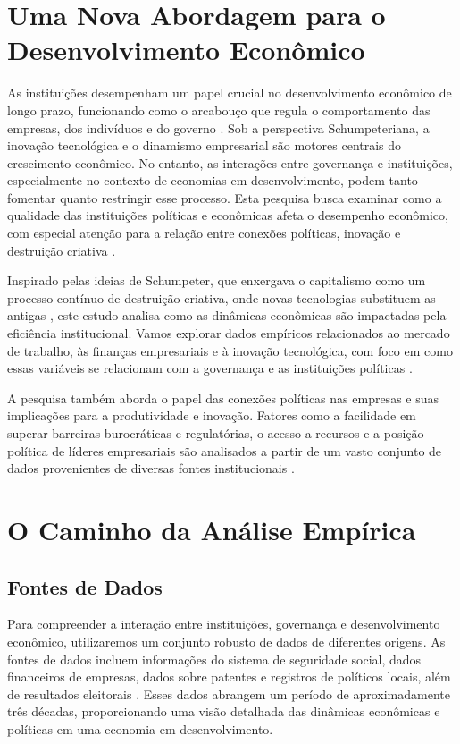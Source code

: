 \section*{Uma Nova Abordagem para o Desenvolvimento Econômico}

As instituições desempenham um papel crucial no desenvolvimento econômico de longo prazo, funcionando como o arcabouço que regula o comportamento das empresas, dos indivíduos e do governo \cite{}. Sob a perspectiva Schumpeteriana, a inovação tecnológica e o dinamismo empresarial são motores centrais do crescimento econômico. No entanto, as interações entre governança e instituições, especialmente no contexto de economias em desenvolvimento, podem tanto fomentar quanto restringir esse processo. Esta pesquisa busca examinar como a qualidade das instituições políticas e econômicas afeta o desempenho econômico, com especial atenção para a relação entre conexões políticas, inovação e destruição criativa \cite{artigo1-SchumpeterianGrowthModel}.

Inspirado pelas ideias de Schumpeter, que enxergava o capitalismo como um processo contínuo de destruição criativa, onde novas tecnologias substituem as antigas \cite{Freitas2007UmaDD}, este estudo analisa como as dinâmicas econômicas são impactadas pela eficiência institucional. Vamos explorar dados empíricos relacionados ao mercado de trabalho, às finanças empresariais e à inovação tecnológica, com foco em como essas variáveis se relacionam com a governança e as instituições políticas \cite{Felipe2008InstituiesEM}.

A pesquisa também aborda o papel das conexões políticas nas empresas e suas implicações para a produtividade e inovação. Fatores como a facilidade em superar barreiras burocráticas e regulatórias, o acesso a recursos e a posição política de líderes empresariais são analisados a partir de um vasto conjunto de dados provenientes de diversas fontes institucionais \cite{Filho_Filho_2022}.

\section*{O Caminho da Análise Empírica}

\subsection*{Fontes de Dados}

Para compreender a interação entre instituições, governança e desenvolvimento econômico, utilizaremos um conjunto robusto de dados de diferentes origens. As fontes de dados incluem informações do sistema de seguridade social, dados financeiros de empresas, dados sobre patentes e registros de políticos locais, além de resultados eleitorais \cite{Pond2005InstituiesEM}. Esses dados abrangem um período de aproximadamente três décadas, proporcionando uma visão detalhada das dinâmicas econômicas e políticas em uma economia em desenvolvimento.

